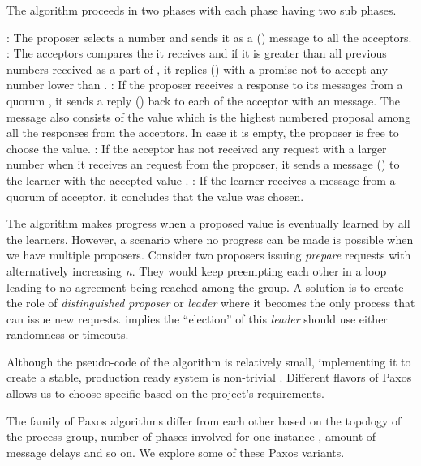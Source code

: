 The algorithm proceeds in two phases with each phase having two sub phases.

\begin{itemize}
  : The proposer selects a number  and sends it as a
   () message to all the acceptors.
  : The acceptors compares the  it
  receives and if it is greater than all previous numbers received as a part of
  , it replies () with a promise not to accept any
  number lower than .
  : If the proposer receives a response to its 
  messages from a quorum%
  , it sends a reply () back to each of the acceptor with an
   message. The message also consists of the value 
  which is the highest numbered proposal among all the responses from the
  acceptors. In case it is empty, the proposer is free to choose the value.
  : If the acceptor has not received any  request
  with a larger number when it receives an  request from the
  proposer, it sends a message () to the learner with the accepted
  value .
  : If the learner receives a message from a quorum of acceptor,
  it concludes that the value  was chosen.
\end{itemize}

The algorithm makes progress when a proposed value is eventually learned by all
the learners. However, a scenario where no progress can be made is possible
when we have multiple proposers. Consider two proposers issuing \emph{prepare}
requests with alternatively increasing \emph{n}. They would keep
preempting each other in a loop leading to no agreement being reached among the
group. A solution is to create the role of \emph{distinguished proposer} or
\emph{leader} where it becomes the only process that can issue new requests.
\citet{FisLynPat85} implies the ``election'' of this \emph{leader}
should use either randomness or timeouts.

Although the pseudo-code of the algorithm is relatively small, implementing it
to create a stable, production ready system is non-trivial \citep{ChandraGR07}.
Different flavors of Paxos allows us to choose specific based on the project's
requirements.

The family of Paxos algorithms differ from each other based on the topology
of the process group, number of phases involved for one instance%
, amount of message delays and so on. We explore some of these Paxos variants.

